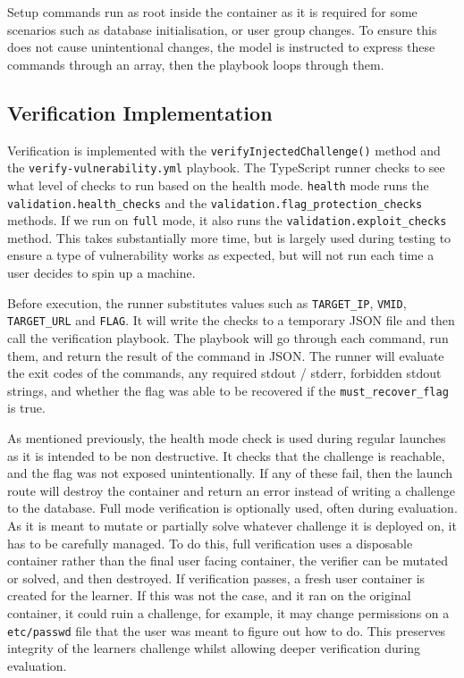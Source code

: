 Setup commands run as root inside the container as it is required for some scenarios such as database initialisation, or user group changes. To ensure this does not cause unintentional changes, the model is instructed to express these commands through an array, then the playbook loops through them.

\subsection{Verification Implementation}\label{sec:verification-implementation}

Verification is implemented with the \lstinline{verifyInjectedChallenge()} method and the \lstinline{verify-vulnerability.yml} playbook. The TypeScript runner checks to see what level of checks to run based on the health mode. \lstinline{health} mode runs the \lstinline{validation.health_checks} and the \lstinline{validation.flag_protection_checks} methods. If we run on \lstinline{full} mode, it also runs the \lstinline{validation.exploit_checks} method. This takes substantially more time, but is largely used during testing to ensure a type of vulnerability works as expected, but will not run each time a user decides to spin up a machine.

Before execution, the runner substitutes values such as \lstinline{TARGET_IP}, \lstinline{VMID}, \lstinline{TARGET_URL} and \lstinline{FLAG}. It will write the checks to a temporary JSON file and then call the verification playbook. The playbook will go through each command, run them, and return the result of the command in JSON. The runner will evaluate the exit codes of the commands, any required stdout / stderr, forbidden stdout strings, and whether the flag was able to be recovered if the \lstinline{must_recover_flag} is true.

As mentioned previously, the health mode check is used during regular launches as it is intended to be non destructive. It checks that the challenge is reachable, and the flag was not exposed unintentionally. If any of these fail, then the launch route will destroy the container and return an error instead of writing a challenge to the database. Full mode verification is optionally used, often during evaluation. As it is meant to mutate or partially solve whatever challenge it is deployed on, it has to be carefully managed. To do this, full verification uses a disposable container rather than the final user facing container, the verifier can be mutated or solved, and then destroyed. If verification passes, a fresh user container is created for the learner. If this was not the case, and it ran on the original container, it could ruin a challenge, for example, it may change permissions on a \lstinline{etc/passwd} file that the user was meant to figure out how to do. This preserves integrity of the learners challenge whilst allowing deeper verification during evaluation.

